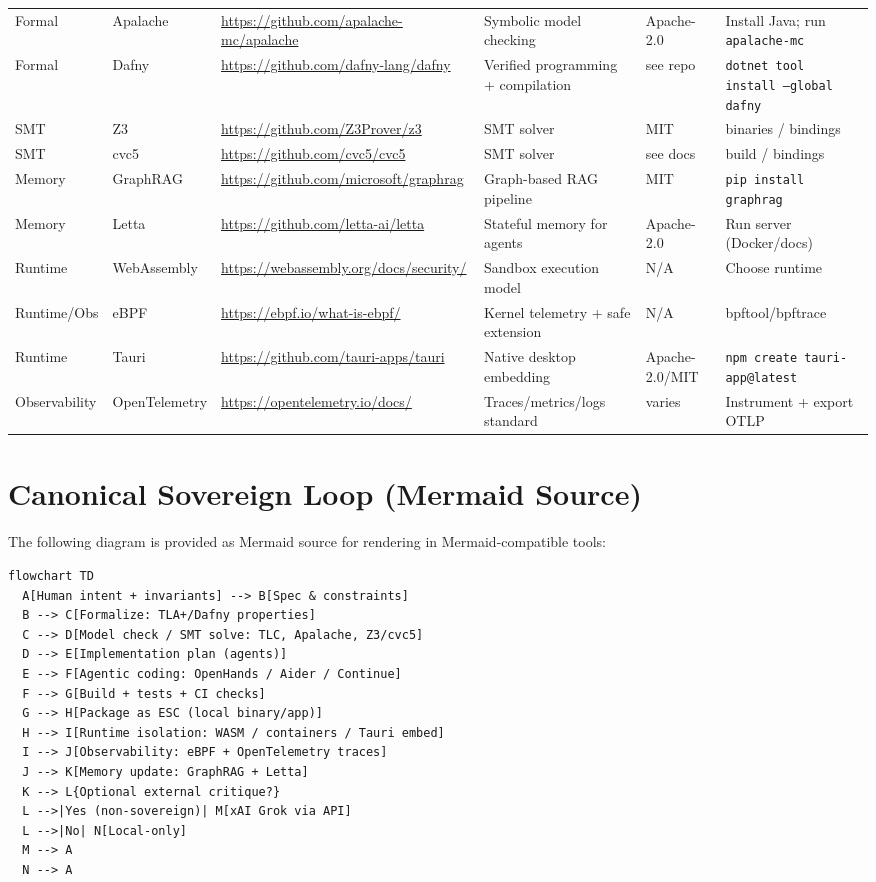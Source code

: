 \documentclass[11pt]{article}
\begin{document}
\begin{longtable}{@{}p{}p{}p{}p{}p{}p{}@{}}
Formal & Apalache & \url{https://github.com/apalache-mc/apalache} & Symbolic model checking & Apache-2.0 & Install Java; run \texttt{apalache-mc}\\
Formal & Dafny & \url{https://github.com/dafny-lang/dafny} & Verified programming + compilation & see repo & \texttt{dotnet tool install --global dafny}\\
SMT & Z3 & \url{https://github.com/Z3Prover/z3} & SMT solver & MIT & binaries / bindings\\
SMT & cvc5 & \url{https://github.com/cvc5/cvc5} & SMT solver & see docs & build / bindings\\
Memory & GraphRAG & \url{https://github.com/microsoft/graphrag} & Graph-based RAG pipeline & MIT & \texttt{pip install graphrag}\\
Memory & Letta & \url{https://github.com/letta-ai/letta} & Stateful memory for agents & Apache-2.0 & Run server (Docker/docs)\\
Runtime & WebAssembly & \url{https://webassembly.org/docs/security/} & Sandbox execution model & N/A & Choose runtime\\
Runtime/Obs & eBPF & \url{https://ebpf.io/what-is-ebpf/} & Kernel telemetry + safe extension & N/A & bpftool/bpftrace\\
Runtime & Tauri & \url{https://github.com/tauri-apps/tauri} & Native desktop embedding & Apache-2.0/MIT & \texttt{npm create tauri-app@latest}\\
Observability & OpenTelemetry & \url{https://opentelemetry.io/docs/} & Traces/metrics/logs standard & varies & Instrument + export OTLP\\
\bottomrule
\end{longtable}

\section{Canonical Sovereign Loop (Mermaid Source)}

The following diagram is provided as Mermaid source for rendering in Mermaid-compatible tools:

\begin{lstlisting}[basicstyle=\ttfamily\small,frame=single]
flowchart TD
  A[Human intent + invariants] --> B[Spec & constraints]
  B --> C[Formalize: TLA+/Dafny properties]
  C --> D[Model check / SMT solve: TLC, Apalache, Z3/cvc5]
  D --> E[Implementation plan (agents)]
  E --> F[Agentic coding: OpenHands / Aider / Continue]
  F --> G[Build + tests + CI checks]
  G --> H[Package as ESC (local binary/app)]
  H --> I[Runtime isolation: WASM / containers / Tauri embed]
  I --> J[Observability: eBPF + OpenTelemetry traces]
  J --> K[Memory update: GraphRAG + Letta]
  K --> L{Optional external critique?}
  L -->|Yes (non-sovereign)| M[xAI Grok via API]
  L -->|No| N[Local-only]
  M --> A
  N --> A
\end{lstlisting}
\end{document}
